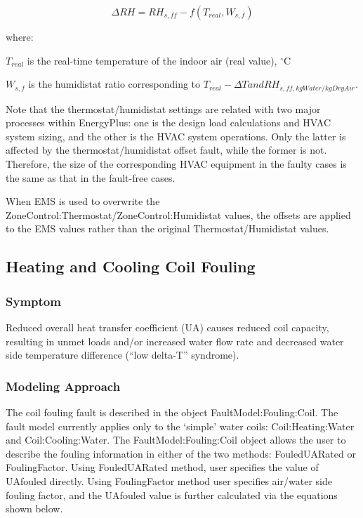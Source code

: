 \begin{equation}
\Delta RH = RH_{s,ff} - f(T_{real}, W_{s,f})
\end{equation}

where:

\(T_{real}\) is the real-time temperature of the indoor air (real value), \(^{\circ}\)C

\(W_{s,f}\) is the humidistat ratio corresponding to \(T_{real} - \Delta T and RH_{s,ff, kgWater/kgDryAir}\).

Note that the thermostat/humidistat settings are related with two major processes within EnergyPlus: one is the design load calculations and HVAC system sizing, and the other is the HVAC system operations. Only the latter is affected by the thermostat/humidistat offset fault, while the former is not. Therefore, the size of the corresponding HVAC equipment in the faulty cases is the same as that in the fault-free cases.

When EMS is used to overwrite the ZoneControl:Thermostat/ZoneControl:Humidistat values, the offsets are applied to the EMS values rather than the original Thermostat/Humidistat values.

\subsection{Heating and Cooling Coil Fouling}\label{heating-and-cooling-coil-fouling}

\subsubsection{Symptom}\label{symptom-2}

Reduced overall heat transfer coefficient (UA) causes reduced coil capacity, resulting in unmet loads and/or increased water flow rate and decreased water side temperature difference (``low delta-T'' syndrome).

\subsubsection{Modeling Approach}\label{modeling-approach-2}

The coil fouling fault is described in the object FaultModel:Fouling:Coil. The fault model currently applies only to the `simple' water coils: Coil:Heating:Water and Coil:Cooling:Water. The FaultModel:Fouling:Coil object allows the user to describe the fouling information in either of the two methods: FouledUARated or FoulingFactor. Using FouledUARated method, user specifies the value of UAfouled directly. Using FoulingFactor method user specifies air/water side fouling factor, and the UAfouled value is further calculated via the equations shown below.

